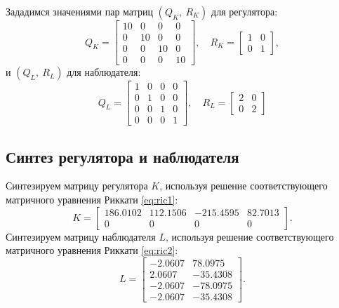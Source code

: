\noindent Зададимся значениями пар матриц $(Q_K,\ R_K)$ для регулятора:
\begin{equation*}
    Q_K=\begin{bmatrix}
        10 & 0 & 0 & 0\\
        0 & 10 & 0 & 0\\
        0 & 0 & 10 & 0\\
        0 & 0 & 0 & 10
    \end{bmatrix},\quad
    R_K=\begin{bmatrix}
        1 & 0 \\
        0 & 1
    \end{bmatrix},
\end{equation*}
и $(Q_L,\ R_L)$ для наблюдателя:
\begin{equation*}
    Q_L=\begin{bmatrix}
        1 & 0 & 0 & 0\\
        0 & 1 & 0 & 0\\
        0 & 0 & 1 & 0\\
        0 & 0 & 0 & 1
    \end{bmatrix},\quad
    R_L=\begin{bmatrix}
        2 & 0 \\
        0 & 2
    \end{bmatrix}
\end{equation*}

\subsection{Синтез регулятора и наблюдателя}
Синтезируем матрицу регулятора $K$, используя решение соответствующего
матричного уравнения Риккати \eqref{eq:ric1}:
\begin{equation*}
    K=\begin{bmatrix}
        186.0102 & 112.1506 & -215.4595 & 82.7013 \\
        0        & 0        & 0         & 0
    \end{bmatrix}.
\end{equation*}
Синтезируем матрицу наблюдателя $L$, используя решение соответствующего
матричного уравнения Риккати \eqref{eq:ric2}:
\begin{equation*}
    L=\begin{bmatrix}
        -2.0607 &  78.0975 \\
         2.0607 & -35.4308 \\
        -2.0607 & -78.0975 \\
        -2.0607 & -35.4308
    \end{bmatrix}.
\end{equation*}

